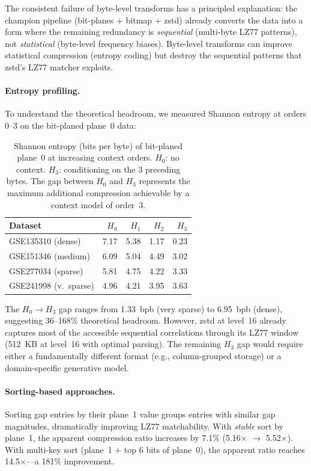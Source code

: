 \documentclass[10pt,twocolumn,letterpaper]{article}
\begin{document}
The consistent failure of byte-level transforms has a principled explanation: the champion pipeline (bit-planes + bitmap + zstd) already converts the data into a form where the remaining redundancy is \emph{sequential} (multi-byte LZ77 patterns), not \emph{statistical} (byte-level frequency biases).
Byte-level transforms can improve statistical compression (entropy coding) but destroy the sequential patterns that zstd's LZ77 matcher exploits.

\paragraph{Entropy profiling.}
To understand the theoretical headroom, we measured Shannon entropy at orders 0--3 on the bit-planed plane~0 data:

\begin{table}[h]
\centering
\caption{Shannon entropy (bits per byte) of bit-planed plane~0 at increasing context orders. $H_0$: no context. $H_3$: conditioning on the 3 preceding bytes. The gap between $H_0$ and $H_3$ represents the maximum additional compression achievable by a context model of order~3.}
\label{tab:entropy_orders}
\footnotesize
\begin{tabular}{lrrrr}
\toprule
Dataset & $H_0$ & $H_1$ & $H_2$ & $H_3$ \\
\midrule
GSE135310 (dense)   & 7.17 & 5.38 & 1.17 & 0.23 \\
GSE151346 (medium)  & 6.09 & 5.04 & 4.49 & 3.02 \\
GSE277034 (sparse)  & 5.81 & 4.75 & 4.22 & 3.33 \\
GSE241998 (v.~sparse) & 4.96 & 4.21 & 3.95 & 3.63 \\
\bottomrule
\end{tabular}
\end{table}

The $H_0 \to H_3$ gap ranges from 1.33~bpb (very sparse) to 6.95~bpb (dense), suggesting 36--168\% theoretical headroom.
However, zstd at level~16 already captures most of the accessible sequential correlations through its LZ77 window (512~KB at level~16 with optimal parsing).
The remaining $H_3$ gap would require either a fundamentally different format (e.g., column-grouped storage) or a domain-specific generative model.

\paragraph{Sorting-based approaches.}
Sorting gap entries by their plane~1 value groups entries with similar gap magnitudes, dramatically improving LZ77 matchability.
With \emph{stable} sort by plane~1, the apparent compression ratio increases by 7.1\% (5.16$\times$ $\to$ 5.52$\times$).
With multi-key sort (plane~1 + top 6 bits of plane~0), the apparent ratio reaches 14.5$\times$---a 181\% improvement.
\end{document}
